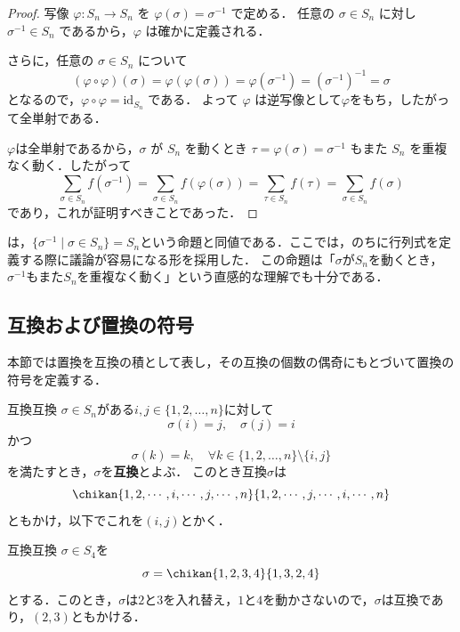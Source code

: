 \begin{leftbar}
\begin{proof}
  写像 $\varphi \colon S_n \to S_n$ を $\varphi(\sigma)=\sigma^{-1}$ で定める．
  任意の $\sigma \in S_n$ に対し $\sigma^{-1}\in S_n$ であるから，$\varphi$ は確かに定義される．

  さらに，任意の $\sigma \in S_n$ について
  \[
    (\varphi \circ \varphi)(\sigma) =\varphi (\varphi(\sigma)) 
    =\varphi (\sigma^{-1}) 
    =(\sigma^{-1})^{-1} 
    =\sigma
  \]
  となるので，$\varphi \circ\varphi=\mathrm{id}_{S_n}$ である．
  よって $\varphi$ は逆写像として$\varphi$をもち，したがって全単射である．

  $\varphi$は全単射であるから，$\sigma$ が $S_n$ を動くとき $\tau=\varphi(\sigma)=\sigma^{-1}$ もまた
  $S_n$ を重複なく動く．したがって
  \[
    \sum_{\sigma\in S_n} f(\sigma^{-1}) 
    =\sum_{\sigma\in S_n} f(\varphi(\sigma)) 
    =\sum_{\tau\in S_n} f(\tau) 
    =\sum_{\sigma\in S_n} f(\sigma)
  \]
  であり，これが証明すべきことであった．
\end{proof}
\end{leftbar}

は，$\{ \sigma^{-1} \mid \sigma \in S_n \} = S_n$という命題と同値である．ここでは，のちに行列式を定義する際に議論が容易になる形を採用した．
この命題は「$\sigma$が$S_n$を動くとき，$\sigma^{-1}$もまた$S_n$を重複なく動く」という直感的な理解でも十分である．

\subsection{互換および置換の符号}

本節では置換を互換の積として表し，その互換の個数の偶奇にもとづいて置換の符号を定義する．


\begin{definition}{互換}{互換}
  $\sigma \in S_n$がある$i, j \in \{1, 2, \dots, n\}$に対して
  \[
  \sigma(i) = j, \quad \sigma(j) = i
  \]
  かつ
  \[
  \sigma(k) = k, \quad \forall k \in \{1, 2, \dots, n\} \setminus \{i, j\}
  \]
  を満たすとき，$\sigma$を\textbf{互換}とよぶ． このとき互換$\sigma$は
  \[
  \chikan{1, 2, \cdots, i, \cdots, j, \cdots, n}{1, 2, \cdots, j, \cdots, i, \cdots, n}
  \]
  ともかけ，以下でこれを$(i,j)$とかく．
\end{definition}

\begin{example}{互換}{互換}
  $\sigma \in S_4$を
  \[
  \sigma = \chikan{1, 2, 3, 4}{1, 3, 2, 4}
  \]
  とする．このとき，$\sigma$は$2$と$3$を入れ替え，$1$と$4$を動かさないので，$\sigma$は互換であり，$(2,3)$ともかける．
\end{example}

